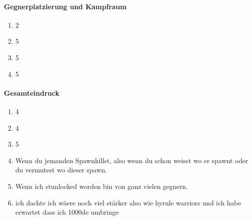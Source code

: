\documentclass[../Main.tex]{subfiles}
\begin{document}
\paragraph{Gegnerplatzierung und Kampfraum}
\begin{enumerate}[label=\textbf{Q\arabic*}, leftmargin=1.5cm, itemsep=0.5em, resume]
\item 2
\item 5
\item 5
\item 5
\end{enumerate}

\paragraph{Gesamteindruck}
\begin{enumerate}[label=\textbf{Q\arabic*}, leftmargin=1.5cm, itemsep=0.5em, resume]
\item 4
\item 4
\item 5
\item Wenn du jemanden Spawnkillst, also wenn du schon weisst wo er spawnt oder du vermutest wo dieser spawn.
\item Wenn ich stunlocked worden bin von ganz vielen gegnern.
\item ich dachte ich wäere noch viel stärker also wie hyrule warriors und ich habe erwartet dass ich 1000de umbringe
\end{enumerate}
\end{document}
